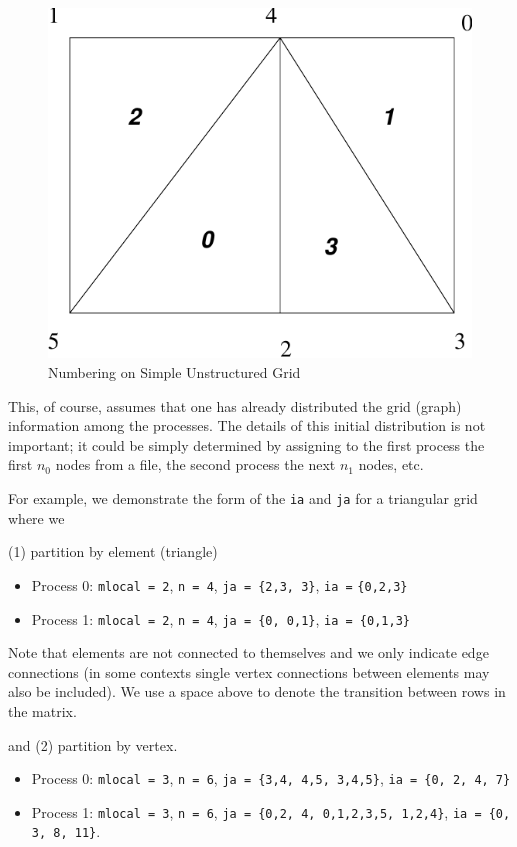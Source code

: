 \begin{figure}[H]
\centerline{ \includegraphics{usg.pdf}}
\caption{Numbering on Simple Unstructured Grid}
\label{fig_usg}
\end{figure}

This, of course, assumes that one has already distributed the grid (graph) information
among the processes. The details of this initial distribution is not important; it
could be simply determined by assigning to the first process the first $n_0$ nodes
from a file, the second process the next $ n_1$ nodes, etc.

For example, we demonstrate the form of the \lstinline{ia} and \lstinline{ja} for a triangular
grid where we

(1) partition by element (triangle)
\begin{itemize}
  \item Process 0: \lstinline{mlocal = 2}, \lstinline{n = 4}, \lstinline{ja = }\texttt{\{2,3, 3\}}, \lstinline{ia =} \texttt{\{0,2,3\}}
  \item Process 1: \lstinline{mlocal = 2}, \lstinline{n = 4}, \lstinline{ja = }\texttt{\{0,  0,1\}}, \lstinline{ia = }\texttt{\{0,1,3\}}
\end{itemize}
Note that elements are not connected to themselves and we only indicate edge connections
(in some contexts single vertex connections between elements may also be included). We use a
space above to denote the transition between rows in the matrix.

and (2) partition by vertex.
\begin{itemize}
  \item Process 0: \lstinline{mlocal = 3}, \lstinline{n = 6}, \lstinline{ja = }\texttt{\{3,4,  4,5, 3,4,5\}}, \lstinline{ia = }\texttt{\{0, 2, 4, 7\}}
  \item Process 1: \lstinline{mlocal = 3}, \lstinline{n = 6}, \lstinline{ja = }\texttt{\{0,2, 4, 0,1,2,3,5, 1,2,4\}}, \lstinline{ia = }\texttt{\{0, 3, 8, 11\}}.
\end{itemize}

